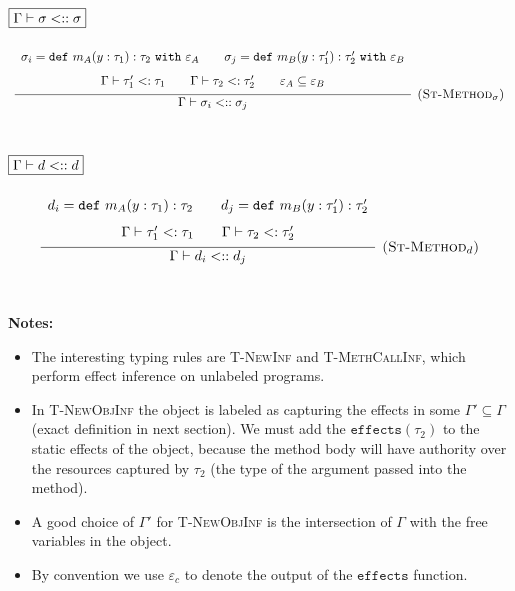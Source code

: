 \documentclass{llncs}
\newcommand{\keywadj}[1]{\mathtt{#1}}
\newcommand{\keyw}[1]{\keywadj{#1}~}
\newcommand{\kw}[1]{\keyw{ #1 }}
\newcommand{\kwa}[1]{\keywadj{ #1 }}
\newcommand{\type}[2]{
	#1~\keyw{with} #2
}
\begin{document}
\noindent
$\fbox{$\Gamma \vdash \sigma <:: \sigma$}$

\[
\begin{array}{c}

\infer[\textsc{(St-Method$_\sigma$)}]
	{ \Gamma \vdash \sigma_i <:: \sigma_j }
{{\def\arraystretch{1.6}
  \begin{array}{c}
\sigma_i = \kw{def} m_A(y : \tau_1) : \type{\tau_2}{\varepsilon_A}
~~~~~~\sigma_j = \kw{def} m_B(y : \tau_1') : \type{\tau_2'}{\varepsilon_B} \\
\Gamma \vdash \tau_1' <: \tau_1 ~~~~~~ \Gamma \vdash \tau_2 <: \tau_2' ~~~~~~ \varepsilon_A \subseteq \varepsilon_B
  \end{array}}} \\[5ex]
 
\end{array}
\]



\noindent
$\fbox{$\Gamma \vdash d <:: d$}$

\[
\begin{array}{c}

\infer[\textsc{(St-Method$_d$)}]
	{ \Gamma \vdash d_i <:: d_j }
{{\def\arraystretch{1.6}
  \begin{array}{c}
d_i = \kw{def} m_A(y : \tau_1) : \tau_2 ~~~~~~ d_j = \kw{def} m_B(y : \tau_1') : \tau_2' \\
\Gamma \vdash \tau_1' <: \tau_1 ~~~~~~ \Gamma \vdash \tau_2 <: \tau_2'
  \end{array}}} \\[5ex]

\end{array}
\]

\noindent \textbf{Notes:}
\begin{itemize}
	\item The interesting typing rules are \textsc{T-NewInf} and \textsc{T-MethCallInf}, which perform effect inference on unlabeled programs.

	\item In \textsc{T-NewObjInf} the object is labeled as capturing the effects in some $\Gamma' \subseteq \Gamma$ (exact definition in next section). We must add the $\kwa{effects}(\tau_2)$ to the static effects of the object, because the method body will have authority over the resources captured by $\tau_2$ (the type of the argument passed into the method).
	\item A good choice of $\Gamma'$ for \textsc{T-NewObjInf} is the intersection of $\Gamma$ with the free variables in the object.
	\item By convention we use $\varepsilon_c$ to denote the output of the $\keywadj{effects}$ function.
\end{itemize}
\end{document}
